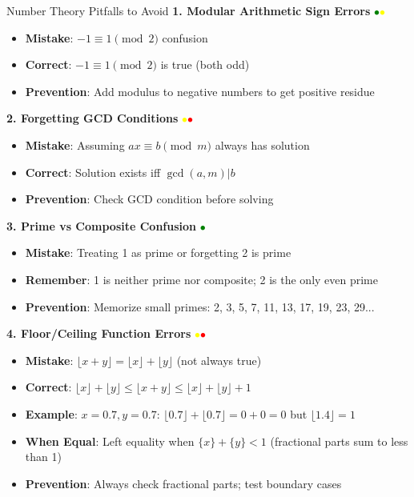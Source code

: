 \documentclass{article}
\begin{document}
\begin{trapbox}{Number Theory Pitfalls to Avoid}
\textbf{1. Modular Arithmetic Sign Errors} \textcolor{green}{$\bullet$}\textcolor{yellow}{$\bullet$}
\begin{itemize}[nosep]
\item \textbf{Mistake}: $-1 \equiv 1 \pmod{2}$ confusion
\item \textbf{Correct}: $-1 \equiv 1 \pmod{2}$ is true (both odd)
\item \textbf{Prevention}: Add modulus to negative numbers to get positive residue
\end{itemize}

\textbf{2. Forgetting GCD Conditions} \textcolor{yellow}{$\bullet$}\textcolor{red}{$\bullet$}
\begin{itemize}[nosep]
\item \textbf{Mistake}: Assuming $ax \equiv b \pmod{m}$ always has solution
\item \textbf{Correct}: Solution exists iff $\gcd(a,m) | b$
\item \textbf{Prevention}: Check GCD condition before solving
\end{itemize}

\textbf{3. Prime vs Composite Confusion} \textcolor{green}{$\bullet$}
\begin{itemize}[nosep]
\item \textbf{Mistake}: Treating 1 as prime or forgetting 2 is prime
\item \textbf{Remember}: 1 is neither prime nor composite; 2 is the only even prime
\item \textbf{Prevention}: Memorize small primes: 2, 3, 5, 7, 11, 13, 17, 19, 23, 29...
\end{itemize}

\textbf{4. Floor/Ceiling Function Errors} \textcolor{yellow}{$\bullet$}\textcolor{red}{$\bullet$}
\begin{itemize}[nosep]
\item \textbf{Mistake}: $\lfloor x + y \rfloor = \lfloor x \rfloor + \lfloor y \rfloor$ (not always true)
\item \textbf{Correct}: $\lfloor x \rfloor + \lfloor y \rfloor \leq \lfloor x+y \rfloor \leq \lfloor x \rfloor + \lfloor y \rfloor + 1$
\item \textbf{Example}: $x=0.7, y=0.7$: $\lfloor 0.7 \rfloor + \lfloor 0.7 \rfloor = 0+0 = 0$ but $\lfloor 1.4 \rfloor = 1$
\item \textbf{When Equal}: Left equality when $\{x\}+\{y\} < 1$ (fractional parts sum to less than 1)
\item \textbf{Prevention}: Always check fractional parts; test boundary cases
\end{itemize}


\end{trapbox}
\end{document}
